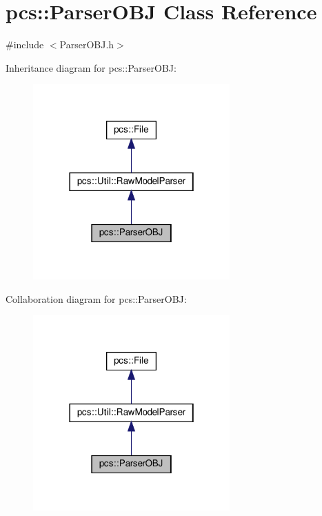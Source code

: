 \hypertarget{classpcs_1_1ParserOBJ}{}\section{pcs\+:\+:Parser\+O\+BJ Class Reference}
\label{classpcs_1_1ParserOBJ}


{\ttfamily \#include $<$Parser\+O\+B\+J.\+h$>$}



Inheritance diagram for pcs\+:\+:Parser\+O\+BJ\+:\nopagebreak
\begin{figure}[H]
\begin{center}
\leavevmode
\includegraphics[width=214pt]{classpcs_1_1ParserOBJ__inherit__graph}
\end{center}
\end{figure}


Collaboration diagram for pcs\+:\+:Parser\+O\+BJ\+:\nopagebreak
\begin{figure}[H]
\begin{center}
\leavevmode
\includegraphics[width=214pt]{classpcs_1_1ParserOBJ__coll__graph}
\end{center}
\end{figure}
